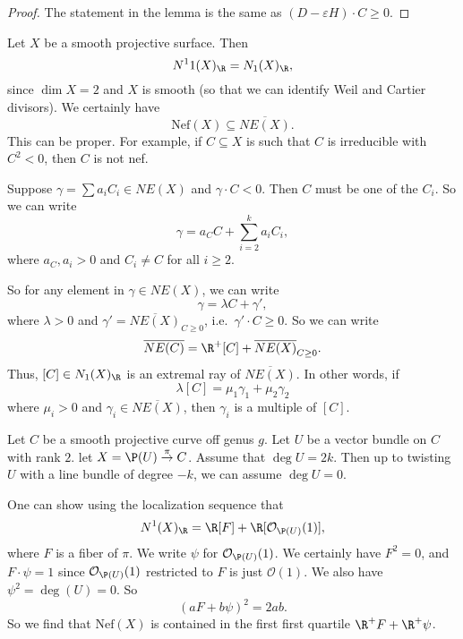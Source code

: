 \documentclass[a4paper]{article}
\newcommand\Nef{\mathrm{Nef}}
\begin{document}
\begin{proof}
  The statement in the lemma is the same as $(D - \varepsilon H) \cdot C \geq 0$.
\end{proof}

\begin{eg}
  Let $X$ be a smooth projective surface. Then
  \[
    N^11(X)_\R = N_1(X)_\R,
  \]
  since $\dim X = 2$ and $X$ is smooth (so that we can identify Weil and Cartier divisors). We certainly have
  \[
    \Nef(X) \subseteq \overline{NE(X)}.
  \]
  This can be proper. For example, if $C \subseteq X$ is such that $C$ is irreducible with $C^2 < 0$, then $C$ is not nef.

  Suppose $\gamma = \sum a_i C_i \in NE(X)$  and $\gamma \cdot C < 0$. Then $C$ must be one of the $C_i$. So we can write
  \[
    \gamma = a_C C + \sum_{i = 2}^k a_i C_i,
  \]
  where $a_C, a_i > 0$ and $C_i \not= C$ for all $i \geq 2$.

  So for any element in $\gamma \in NE(X)$, we can write
  \[
    \gamma = \lambda C + \gamma',
  \]
  where $\lambda > 0$ and $\gamma' = \overline{NE(X)}_{C \geq 0}$, i.e.\ $\gamma' \cdot C \geq 0$. So we can write
  \[
    \overline{NE(C)} = \R^+[C] + \overline{NE(X)}_{C \geq 0}.
  \]
  Thus, $[C] \in N_1(X)_\R$ is an extremal ray of $\overline{NE(X)}$. In other words, if
  \[
    \lambda [C] = \mu_1 \gamma_1 + \mu_2 \gamma_2
  \]
  where $\mu_i > 0$ and $\gamma_i \in \overline{NE(X)}$, then $\gamma_i$ is a multiple of $[C]$.
\end{eg}

\begin{eg}
  Let $C$ be a smooth projective curve off genus $g$. Let $U$ be a vector bundle on $C$ with rank $2$. let $X = \P(U) \overset{\pi}{\to} C$. Assume that $\deg U = 2k$. Then up to twisting $U$ with a line bundle of degree $-k$, we can assume $\deg U = 0$.

  One can show using the localization sequence that %
  \[
    N^1(X)_\R = \R[F] + \R[\mathcal{O}_{\P(U)}(1)],
  \]
  where $F$ is a fiber of $\pi$. We write $\psi$ for $\mathcal{O}_{\P(U)}(1)$. We certainly have $F^2 = 0$, and $F \cdot \psi = 1$ since $\mathcal{O}_{\P(U)}(1)$ restricted to $F$ is just $\mathcal{O}(1)$. We also have $\psi^2 = \deg (U) = 0$. So
  \[
    (aF + b\psi)^2 = 2 ab.
  \]
  So we find that $\Nef(X)$ is contained in the first first quartile $\R^+ F + \R^+ \psi$.
\end{eg}
\printindex
\end{document}
